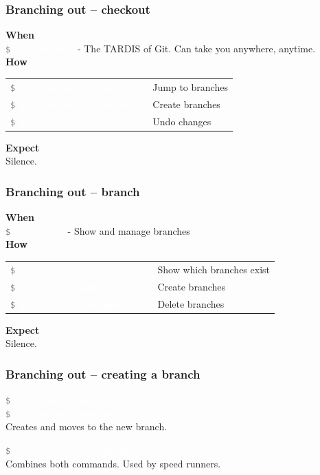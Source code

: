 \documentclass{beamer}
\newcommand{\keyword}[1]{\hspace{-1.0em}\textcolor{lkblue}{\textbf{#1}}\vspace{0.2em}} %
\newcommand{\command}[1]{\colorbox{black!78}{\vphantom{Ep}\texttt{\textcolor{gray}{\$}
\textcolor{white}{#1}}}}
\begin{document}
\begin{frame}
  \frametitle{Branching out -- checkout}

    \keyword{When} \\
    \command{git checkout} - The TARDIS of Git. Can take you anywhere, anytime. \\[1em]

    \keyword{How} \\
    \hspace{-0.95em}
    \begin{tabular}{ll}
        \command{git checkout mybranch} & Jump to branches \\
        \command{git checkout -b newbranch} & Create branches \\
        \command{git checkout -- file.txt} & Undo changes \\
    \end{tabular}

    \vspace{1em}
    \keyword{Expect} \\
    Silence.

\end{frame}

\begin{frame}
  \frametitle{Branching out -- branch}

    \keyword{When} \\
    \command{git branch} - Show and manage branches \\[1em]

    \keyword{How} \\
    \hspace{-0.95em}
    \begin{tabular}{ll}
        \command{git branch} & Show which branches exist \\ 
        \command{git branch newbranch} & Create branches \\
        \command{git branch -d mergedbranch} & Delete branches \\
    \end{tabular}

    \vspace{1em}
    \keyword{Expect} \\
    Silence.
\end{frame}

\begin{frame}
  \frametitle{Branching out -- creating a branch}

  \command{git branch newbranch} \\
  \command{git checkout newbranch} \\
  Creates and moves to the new branch.
  \vspace{1em}

  \command{git checkout -b newbranch} \\
  Combines both commands. Used by speed runners.

\end{frame}
\end{document}
